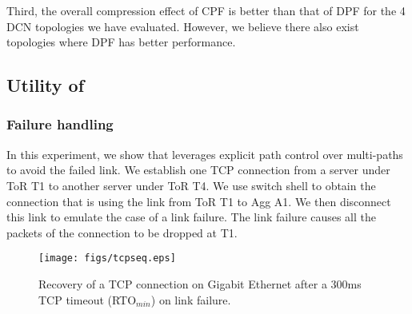 Third, the overall compression effect of CPF is better than that of DPF for the 4 DCN topologies we have evaluated. However, we believe there also exist topologies where DPF has better performance.



\subsection{Utility of \sys}\label{subsec:utility}


\subsubsection{Failure handling}\label{sssub:failure}
In this experiment, we show that \sys leverages explicit path control over multi-paths to avoid the failed link. We establish one TCP connection from a server under ToR T1 to another server under ToR T4. We use switch shell to obtain the connection that is using the link from ToR T1 to Agg A1. We then disconnect this link to emulate the case of a link failure. The link failure causes all the packets of the connection to be dropped at T1.

\begin{figure}[t]
\centering
\texttt{[image: figs/tcpseq.eps]}
\caption{Recovery of a TCP connection on Gigabit Ethernet after a 300ms TCP timeout (RTO$_{min}$) on link failure.} \label{fig:eval.tcpseq}
\end{figure}

